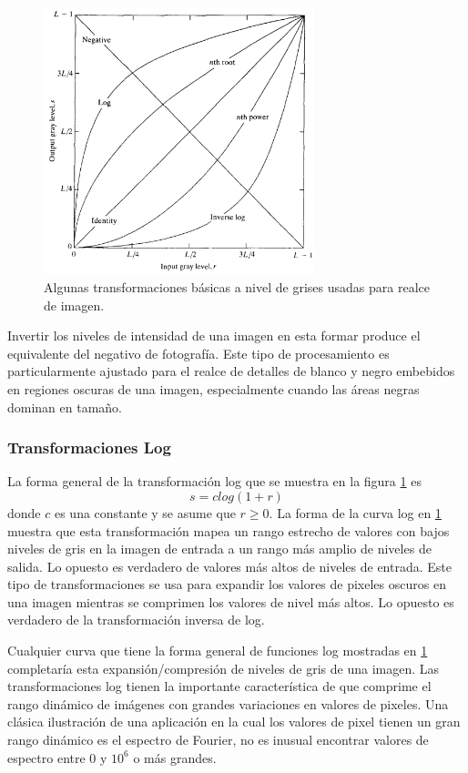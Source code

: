 		\begin{figure}[H]
			\centering
			\includegraphics[width=0.7\textwidth]{capitulo2/images/input_gray_level.png}
			\caption{Algunas transformaciones básicas a nivel de grises usadas para realce de imagen.}
			\label{fig:inp_gray_lev}
		\end{figure}
	      Invertir los niveles de intensidad de una imagen en esta formar produce el equivalente del negativo de fotografía. Este tipo de procesamiento es particularmente ajustado para el realce de detalles de blanco y negro embebidos en regiones oscuras de una imagen, especialmente cuando las áreas negras dominan en tamaño. 
		\subsubsection{Transformaciones Log}
		
		La forma general de la transformación log que se muestra en la figura \ref{fig:inp_gray_lev} es
		\begin{equation}
			s = clog(1 + r)
		\end{equation}
		donde $c$ es una constante y se asume que $r\geq0$. La forma de la curva log en \ref{fig:inp_gray_lev} muestra que esta transformación mapea un rango estrecho de valores con bajos niveles de gris en la imagen de entrada a un rango más amplio de niveles  de salida. Lo opuesto es verdadero de valores más altos de niveles de entrada. Este tipo de transformaciones se usa para expandir los valores de pixeles oscuros en una imagen mientras se comprimen los valores de nivel más altos. Lo opuesto es verdadero de la transformación inversa de log.
		
		Cualquier curva que tiene la forma general de funciones log mostradas en \ref{fig:inp_gray_lev} completaría esta expansión/compresión de niveles de gris de una imagen. Las transformaciones log tienen la importante característica de que comprime el rango dinámico de imágenes con grandes variaciones en valores de pixeles. Una clásica ilustración de una aplicación en la cual los valores de pixel tienen un gran rango dinámico es el espectro de Fourier, no es inusual encontrar valores de espectro entre $0$ y $10^6$ o más grandes.
		
